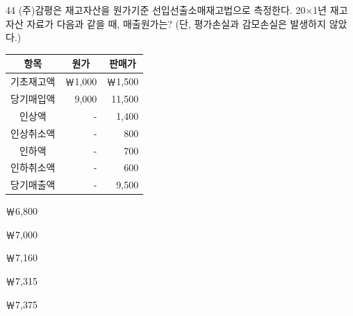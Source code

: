 \begin{question}{44}
(주)감평은 재고자산을 원가기준 선입선출소매재고법으로 측정한다. 20×1년 재고자산 자료가 다음과 같을 때, 매출원가는? (단, 평가손실과 감모손실은 발생하지 않았다.)
\par{\small\centering\begin{tabular}{|c|r|r|}\hline
항목 & \multicolumn{1}{c|}{원가} & \multicolumn{1}{c|}{판매가} \tabularnewline\hline
기초재고액 & ￦1,000 & ￦1,500 \tabularnewline\hline
당기매입액 & 9,000 & 11,500 \tabularnewline\hline
인상액 & - & 1,400 \tabularnewline\hline
인상취소액 & - & 800 \tabularnewline\hline
인하액 & - & 700 \tabularnewline\hline
인하취소액 & - & 600 \tabularnewline\hline
당기매출액 & - & 9,500 \tabularnewline\hline
\end{tabular}\par}
\begin{choices}
  \item ￦6,800
  \item ￦7,000
  \item ￦7,160
  \item ￦7,315
  \item ￦7,375
\end{choices}
\end{question}
